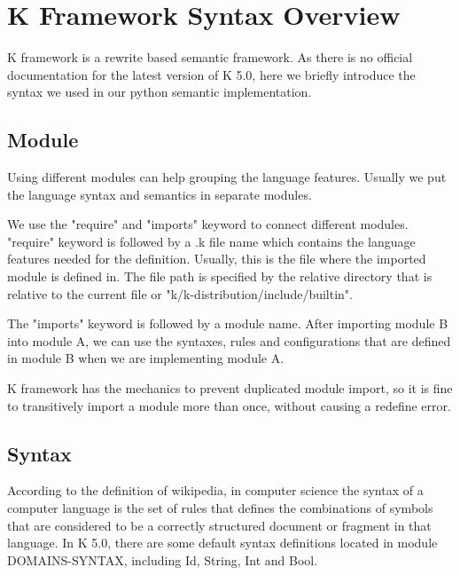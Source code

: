 \documentclass[a4paper]{article}
\begin{document}
\section{K Framework Syntax Overview}
K framework is a rewrite based semantic framework. As there is no official documentation for the latest version of K 5.0, here we briefly introduce the syntax we used in our python semantic implementation.
\subsection{Module}
Using different modules can help grouping the language features. Usually we put the language syntax and semantics in separate modules.

We use the "require" and "imports" keyword to connect different modules. "require" keyword is followed by a .k file name which contains the language features needed for the definition. Usually, this is the file where the imported module is defined in. The file path is specified by the relative directory that is relative to the current file or "k/k-distribution/include/builtin". 

The "imports" keyword is followed by a module name. After importing module B into module A, we can use the syntaxes, rules and configurations that are defined in module B when we are implementing module A.

K framework has the mechanics to prevent duplicated module import, so it is fine to transitively import a module more than once, without causing a redefine error.

\subsection{Syntax}
According to the definition of wikipedia, in computer science the syntax of a computer language is the set of rules that defines the combinations of symbols that are considered to be a correctly structured document or fragment in that language. In K 5.0, there are some default syntax definitions located in module DOMAINS-SYNTAX, including Id, String, Int and Bool.
\end{document}
